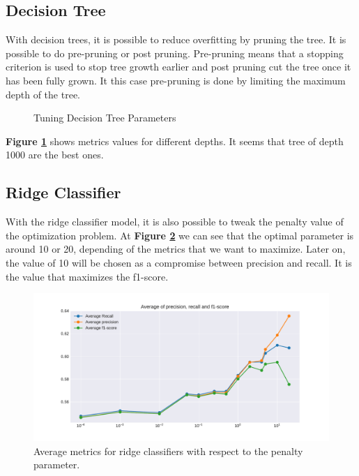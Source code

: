 \subsection{Decision Tree}
With decision trees, it is possible to reduce overfitting by pruning the tree. It is possible to do pre-pruning or post pruning. Pre-pruning means that a stopping criterion is used to stop tree growth earlier and post pruning cut the tree once it has been fully grown. It this case pre-pruning is done by limiting the maximum depth of the tree. 
\begin{figure}[]
 \centering
 \caption{Tuning Decision Tree Parameters }
 \label{fig:chap3:dt}
\end{figure}
\textbf{Figure \ref{fig:chap3:dt}} shows metrics values for different depths. It seems that tree of depth 1000 are the best ones.
\subsection{Ridge Classifier}
With the ridge classifier model, it is also possible to tweak the penalty value of the optimization problem. At \textbf{Figure \ref{fig:chap3:ridge1}} we can see that the optimal parameter is around 10 or 20, depending of the metrics that we want to maximize. Later on, the value of 10 will be chosen as a compromise between precision and recall. It is the value that maximizes the f1-score. 
\begin{figure}
 \centering
 \includegraphics[width=1\textwidth]{images/chapitre3/liar-ridge}
 \caption{Average metrics for ridge classifiers with respect to the penalty parameter.}
 \label{fig:chap3:ridge1}
\end{figure} 
